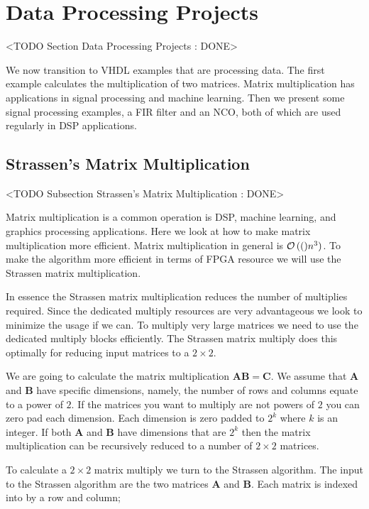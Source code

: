 \section{Data Processing Projects}
	<TODO Section Data Processing Projects : DONE>
	
We now transition to \ac{VHDL} examples that are processing data. The first example calculates the multiplication of two matrices. Matrix multiplication has applications in signal processing and machine learning. Then we present some signal processing examples, a \ac{FIR} filter and an \ac{NCO}, both of which are used regularly in \ac{DSP} applications. 

\subsection{Strassen's Matrix Multiplication}
	<TODO Subsection Strassen's Matrix Multiplication : DONE>
	
Matrix multiplication is a common operation is \ac{DSP}, machine learning, and graphics processing applications. Here we look at how to make matrix multiplication more efficient. Matrix multiplication in general is ${{\mathcal{O}}\left( ( \right)}n^3)$. To make the algorithm more efficient in terms of \ac{FPGA} resource we will use the Strassen matrix multiplication. 

In essence the Strassen matrix multiplication reduces the number of multiplies required. Since the dedicated multiply resources are very advantageous we look to minimize the usage if we can. To multiply very large matrices we need to use the dedicated multiply blocks efficiently. The Strassen matrix multiply does this optimally for reducing input matrices to a $2 \times 2$.

We are going to calculate the matrix multiplication $\mathbf{A}\mathbf{B}=\mathbf{C}$. We assume that $\mathbf{A}$ and $\mathbf{B}$ have specific dimensions, namely, the number of rows and columns equate to a power of $2$. If the matrices you want to multiply are not powers of $2$ you can zero pad each dimension. Each dimension is zero padded to $2^k$ where $k$ is an integer. If both $\mathbf{A}$ and $\mathbf{B}$ have dimensions that are $2^k$ then the matrix multiplication can be recursively reduced to a number of $2 \times 2$ matrices. 

To calculate a $2 \times 2$ matrix multiply we turn to the Strassen algorithm. The input to the Strassen algorithm are the two matrices $\mathbf{A}$ and $\mathbf{B}$. Each matrix is indexed into by a row and column;

